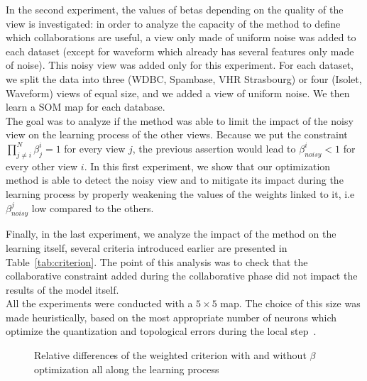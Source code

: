 In the second experiment, the values of betas depending on the quality of the view is investigated: in order to analyze the capacity of the method to define which collaborations are useful, a view only made of uniform noise was added to each dataset (except for waveform which already has several features only made of noise). This noisy view was added only for this experiment.
For each dataset, we split the data into three (WDBC, Spambase, VHR Strasbourg) or four (Isolet, Waveform) views of equal size, and we added a view of uniform noise. We then learn a SOM map for each database. \\
The goal was to analyze if the method was able to limit the impact of the noisy view on the learning process of the other views. Because we put the constraint $\prod_{j \neq i}^N \beta_j^i = 1$ for every view $j$, the previous assertion would lead to $\beta_{noisy}^i < 1$ for every other view $i$. In this first experiment, we show that our optimization method is able to detect the noisy view and to mitigate its impact during the learning process by properly weakening the values of the weights linked to it, i.e $\beta_{noisy}^j$ low compared to the others.


Finally, in the last experiment, we analyze the impact of the method on the learning itself, several criteria introduced earlier are presented in Table~\ref{tab:criterion}. The point of this analysis was to check that the collaborative constraint added during the collaborative phase did not impact the results of the model itself. \\

 

All the experiments were conducted with a $5\times5$ map. 
The choice of this size was made heuristically, based on the most appropriate number of neurons which optimize the quantization and topological errors during the local step~\cite{grozavu2010topological}.


\begin{figure}[!h]
	\centering

    \centering
	\caption{Relative differences of the weighted criterion with and without $\beta$ optimization all along the learning process}
\label{fig:relative_difference}
\end{figure}


